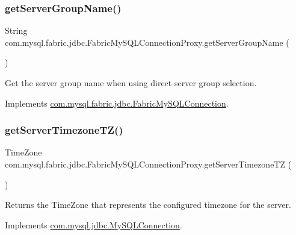 \subsubsection{\texorpdfstring{get\+Server\+Group\+Name()}{getServerGroupName()}}
{\footnotesize\ttfamily String com.\+mysql.\+fabric.\+jdbc.\+Fabric\+My\+S\+Q\+L\+Connection\+Proxy.\+get\+Server\+Group\+Name (\begin{DoxyParamCaption}{ }\end{DoxyParamCaption})}

Get the server group name when using direct server group selection. 

Implements \mbox{\hyperlink{interfacecom_1_1mysql_1_1fabric_1_1jdbc_1_1_fabric_my_s_q_l_connection_a67f82a83e756232c8d86a9ae8a1a0dce}{com.\+mysql.\+fabric.\+jdbc.\+Fabric\+My\+S\+Q\+L\+Connection}}.

\mbox{\label{classcom_1_1mysql_1_1fabric_1_1jdbc_1_1_fabric_my_s_q_l_connection_proxy_aa7681c7b1a3e0e15195537b76729ad3b}} 
\subsubsection{\texorpdfstring{get\+Server\+Timezone\+T\+Z()}{getServerTimezoneTZ()}}
{\footnotesize\ttfamily Time\+Zone com.\+mysql.\+fabric.\+jdbc.\+Fabric\+My\+S\+Q\+L\+Connection\+Proxy.\+get\+Server\+Timezone\+TZ (\begin{DoxyParamCaption}{ }\end{DoxyParamCaption})}

Returns the Time\+Zone that represents the configured timezone for the server. 

Implements \mbox{\hyperlink{interfacecom_1_1mysql_1_1jdbc_1_1_my_s_q_l_connection_a28586f911062106cb730733427568fc7}{com.\+mysql.\+jdbc.\+My\+S\+Q\+L\+Connection}}.

